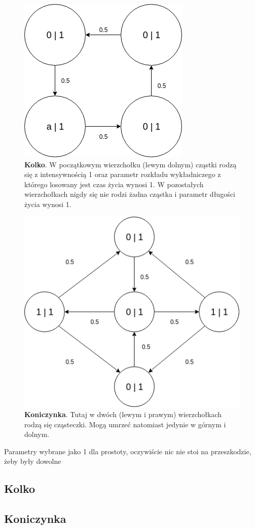\documentclass{article}
\begin{document}
\begin{figure}[h!]
\centering
\includegraphics[width=0.6\linewidth]{kolko}
\caption{\textbf{Kolko}. W początkowym wierzchołku (lewym dolnym) cząstki rodzą się z intensywnością 1 oraz parametr rozkładu wykładniczego z którego losowany jest czas życia wynosi 1. W pozostałych wierzchołkach nigdy się nie rodzi żadna cząstka i parametr długości życia wynosi 1.}
\end{figure}

\begin{figure}[h!]
\centering
\includegraphics[width=0.6\linewidth]{koniczynka}
\caption{\textbf{Koniczynka}. Tutaj w dwóch (lewym i prawym) wierzchołkach rodzą się cząsteczki. Mogą umrzeć natomiast jedynie w górnym i dolnym.}
\end{figure}\newpage
Parametry wybrane jako 1 dla prostoty, oczywiście nic nie stoi na przeszkodzie, żeby były dowolne

\subsection{Kolko}
\subsection{Koniczynka}
\end{document}
